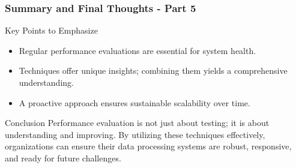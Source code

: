 \documentclass[aspectratio=169]{beamer}
\begin{document}
\begin{frame}[fragile]
  \frametitle{Summary and Final Thoughts - Part 5}
  \begin{block}{Key Points to Emphasize}
    \begin{itemize}
      \item Regular performance evaluations are essential for system health.
      \item Techniques offer unique insights; combining them yields a comprehensive understanding.
      \item A proactive approach ensures sustainable scalability over time.
    \end{itemize}
  \end{block}
  
  \begin{block}{Conclusion}
    Performance evaluation is not just about testing; it is about understanding and improving. By utilizing these techniques effectively, organizations can ensure their data processing systems are robust, responsive, and ready for future challenges.
  \end{block}
\end{frame}
\end{document}
